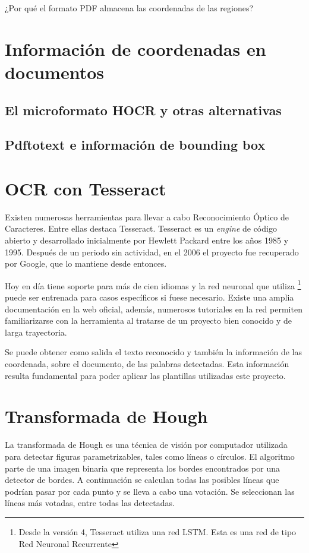 ¿Por qué el formato PDF almacena las coordenadas de las regiones?

\section{Información de coordenadas en documentos}
\subsection{El microformato HOCR y otras alternativas}
\subsection{Pdftotext e información de bounding box}

\section{OCR con Tesseract}

Existen numerosas herramientas para llevar a cabo Reconocimiento Óptico de Caracteres. Entre ellas destaca Tesseract. Tesseract es un \emph{engine} de código abierto y desarrollado inicialmente por Hewlett Packard entre los años 1985 y 1995. Después de un periodo sin actividad, en el 2006 el proyecto fue recuperado por Google, que lo mantiene desde entonces.

Hoy en día tiene soporte para más de cien idiomas y la red neuronal que utiliza \footnote{Desde la versión 4, Tesseract utiliza una red LSTM. Esta es una red de tipo Red Neuronal Recurrente} puede ser entrenada para casos específicos si fuese necesario. Existe una amplia documentación en la web oficial, además, numerosos tutoriales en la red permiten familiarizarse con la herramienta al tratarse de un proyecto bien conocido y de larga trayectoria.

Se puede obtener como salida el texto reconocido y también la información de las coordenada, sobre el documento, de las palabras detectadas. Esta información resulta fundamental para poder aplicar las plantillas utilizadas este proyecto. 

\section{Transformada de Hough}

La transformada de Hough es una técnica de visión por computador utilizada para detectar figuras parametrizables, tales como líneas o círculos. El algoritmo parte de una imagen binaria que representa los bordes encontrados por una detector de bordes. A continuación se calculan todas las posibles líneas que podrían pasar por cada punto y se lleva a cabo una votación. Se seleccionan las líneas más votadas, entre todas las detectadas.

